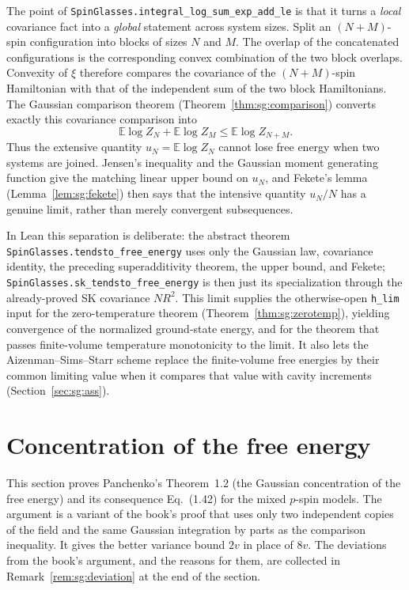 \begin{remark}\label{rem:sg:gt-intuition}
The point of \texttt{SpinGlasses.integral\_log\_sum\_exp\_add\_le} is that it turns a \emph{local} covariance fact into a \emph{global} statement across system sizes.  Split an $(N+M)$-spin configuration into blocks of sizes $N$ and $M$.  The overlap of the concatenated configurations is the corresponding convex combination of the two block overlaps.  Convexity of $\xi$ therefore compares the covariance of the $(N+M)$-spin Hamiltonian with that of the independent sum of the two block Hamiltonians.  The Gaussian comparison theorem (Theorem~\ref{thm:sg:comparison}) converts exactly this covariance comparison into
\[
  \mathbb E\log Z_N+\mathbb E\log Z_M\leq\mathbb E\log Z_{N+M}.
\]
Thus the extensive quantity $u_N=\mathbb E\log Z_N$ cannot lose free energy when two systems are joined.  Jensen's inequality and the Gaussian moment generating function give the matching linear upper bound on $u_N$, and Fekete's lemma (Lemma~\ref{lem:sg:fekete}) then says that the intensive quantity $u_N/N$ has a genuine limit, rather than merely convergent subsequences.

In Lean this separation is deliberate: the abstract theorem \texttt{SpinGlasses.tendsto\_free\_energy} uses only the Gaussian law, covariance identity, the preceding superadditivity theorem, the upper bound, and Fekete; \texttt{SpinGlasses.sk\_tendsto\_free\_energy} is then just its specialization through the already-proved SK covariance $N R^2$.  This limit supplies the otherwise-open \texttt{h\_lim} input for the zero-temperature theorem (Theorem~\ref{thm:sg:zerotemp}), yielding convergence of the normalized ground-state energy, and for the theorem that passes finite-volume temperature monotonicity to the limit.  It also lets the Aizenman--Sims--Starr scheme replace the finite-volume free energies by their common limiting value when it compares that value with cavity increments (Section~\ref{sec:sg:ass}).
\end{remark}

\section{Concentration of the free energy}\label{sec:sg:fe-conc}

This section proves Panchenko's Theorem~1.2 (the Gaussian concentration of the free energy) and its consequence Eq.~(1.42)
for the mixed $p$-spin models. The argument is a variant of the book's proof that uses only two independent copies of the field and
the same Gaussian integration by parts as the comparison inequality. It gives the better variance bound $2v$ in place of $8v$. The deviations from the
book's argument, and the reasons for them, are collected in Remark~\ref{rem:sg:deviation} at the end of the section.

